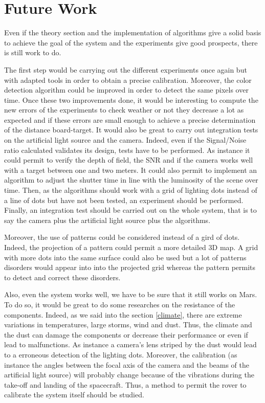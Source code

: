 \chapter*{Future Work}

Even if the theory section and the implementation of algorithms give a solid basis to achieve the goal of the system and the experiments give good prospects, there is still work to do.

The first step would be carrying out the different experiments once again but with adapted tools in order to obtain a precise calibration. Moreover, the color detection algorithm could be improved in order to detect the same pixels over time. Once these two improvements done, it would be interesting to compute the new errors of the experiments to check weather or not they decrease a lot as expected and if these errors are small enough to achieve a precise determination of the distance board-target. It would also be great to carry out integration tests on the artificial light source and the camera. Indeed, even if the Signal/Noise ratio calculated validates its design, tests have to be performed. As instance it could permit to verify the depth of field, the SNR and if the camera works well with a target between one and two meters. It could also permit to implement an algorithm to adjust the shutter time in line with the luminosity of the scene over time. Then, as the algorithms should work with a grid of lighting dots instead of a line of dots but have not been tested, an experiment should be performed. Finally, an integration test should be carried out on the whole system, that is to say the camera plus the artificial light source plus the algorithms.

Moreover, the use of patterns could be considered instead of a gird of dots. Indeed, the projection of a pattern could permit a more detailed 3D map. A grid with more dots into the same surface could also be used but a lot of patterns disorders would appear into into the projected grid whereas the pattern permits to detect and correct these disorders.

Also, even the system works well, we have to be sure that it still works on Mars. To do so, it would be great to do some researches on the resistance of the components. Indeed, as we said into the section \ref{climate}, there are extreme variations in temperatures, large storms, wind and dust. Thus, the climate and the dust can damage the components or decrease their performance or even if lead to malfunctions. As instance a camera's lens striped by the dust would lead to a erroneous detection of the lighting dots. Moreover, the calibration (as instance the angles between the focal axis of the camera and the beams of the artificial light source) will probably change because of the vibrations during the take-off and landing of the spacecraft. Thus, a method to permit the rover to calibrate the system itself should be studied.

